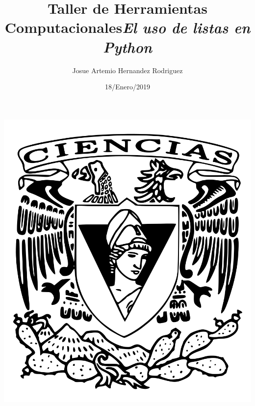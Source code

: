\documentclass[letterpaper, 12pt,oneside]{article}
\title{\Huge Taller de Herramientas Computacionales}
\author{Josue Artemio Hernandez Rodriguez}
\date{18/Enero/2019}
\begin{document}
	\maketitle
	\begin{center}
		\includegraphics[scale=0.2]{2.png}
	\end{center}

	\newpage
	
	\title{\huge \textit{El uso de listas en Python}}\\
	
\end{document}
